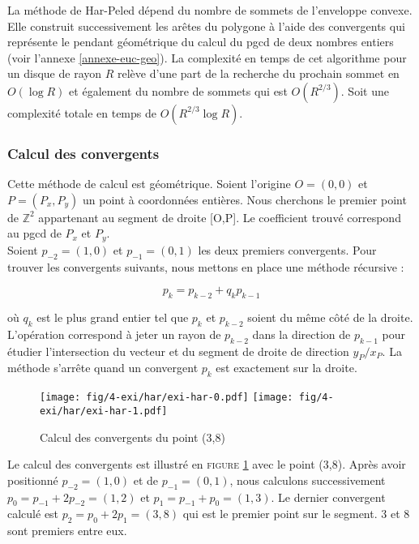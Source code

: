La méthode de Har-Peled dépend du nombre de sommets de l'enveloppe convexe. Elle construit successivement les arêtes du polygone à l'aide des convergents qui représente le pendant géométrique du calcul du pgcd de deux nombres entiers (voir l'annexe \ref{annexe-euc-geo}). La complexité en temps de cet algorithme pour un disque de rayon $R$ relève d'une part de la recherche du prochain sommet en $O(\log R)$ et également du nombre de sommets qui est $O(R^{2/3})$. Soit une complexité totale en temps de $O( R^{2/3} \log R)$.

\subsubsection{Calcul des convergents}

Cette méthode de calcul est géométrique. Soient l’origine $O=(0,0)$ et $P = (P_x, P_y)$ un point à coordonnées entières. Nous cherchons le premier point de $\mathbb{Z}^{2}$ appartenant au segment de droite [O,P]. Le coefficient trouvé correspond au pgcd de $P_x$ et $P_y$.\\

Soient $p_{-2} = (1,0)$ et $p_{-1} = (0,1)$ les deux premiers convergents. Pour trouver les convergents suivants, nous mettons en place une méthode récursive :

$$p_{k} = p_{k-2} + q_k p_{k-1}$$

où $q_k$ est le plus grand entier tel que $p_{k}$ et $p_{k-2}$ soient du même côté de la droite.\\

L'opération correspond à jeter un rayon de $p_{k-2}$ dans la direction de $p_{k-1}$ pour étudier l’intersection du vecteur et du segment de droite de direction $y_P / x_P$. La méthode s’arrête quand un convergent $p_{k}$ est exactement sur la droite.\\

\begin{figure}[H]
  \centering
  \texttt{[image: fig/4-exi/har/exi-har-0.pdf]}
  \texttt{[image: fig/4-exi/har/exi-har-1.pdf]}
  \caption{Calcul des convergents du point (3,8)}
  \label{fig:conv}
\end{figure}

Le calcul des convergents est illustré en \textsc{figure} \ref{fig:conv} avec le point (3,8). Après avoir positionné $p_{-2} = (1,0)$ et de $p_{-1} = (0,1)$, nous calculons successivement $p_{0} = p_{-1} + 2p_{-2} = (1,2)$ et  $p_{1} = p_{-1} + p_{0} = (1,3)$. Le dernier convergent calculé est $p_{2} = p_{0} + 2p_{1} = (3,8)$ qui est le premier point sur le segment. 3 et 8 sont premiers entre eux.

